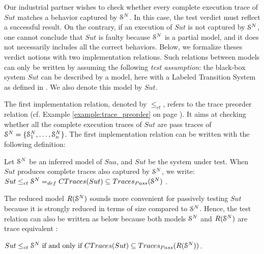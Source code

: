 Our industrial partner wishes to check whether every complete
execution trace of $\mathit{Sut}$ matches a behavior captured by
$\EuScript{S}^{N}$. In this case, the test verdict must reflect a
successful result. On the contrary, if an execution of
$\mathit{Sut}$ is not captured by $\EuScript{S}^{N}$, one cannot
conclude that $\mathit{Sut}$ is faulty because $\EuScript{S}^{N}$
is a partial model, and it does not necessarily includes all the
correct behaviors. Below, we formalize theses verdict notions
with two implementation relations. Such relations between models
can only be written by assuming the following \emph{test
assumption}: the black-box system $\mathit{Sut}$ can be described
by a model, here with a Labeled Transition System as defined in
. We also
denote this model by $\mathit{Sut}$.

The first implementation relation, denoted by $\leq_{ct}$, refers
to the trace preorder relation
\cite{DNH84,vaandrager1991relationship} (cf. Example
\ref{example:trace_preorder} on page
\pageref{example:trace_preorder}).
It aims at checking whether all the complete execution traces of
$\mathit{Sut}$ are pass traces of
$\EuScript{S}^{N}=\{\EuScript{S}_1^{N},\dots,\EuScript{S}_n^{N}\}$.
The first implementation relation can be written with the
following definition:

\begin{definition}
\label{rel:impl1}

Let $\EuScript{S}^{N}$ be an inferred model of $\mathit{Sua}$, and
$\mathit{Sut}$ be the system under test. When $\mathit{Sut}$
produces complete traces also captured by $\EuScript{S}^{N}$, we
write: ${Sut} \leq_{ct} \EuScript{S}^{N} =_{def} CTraces({Sut})
\subseteq  Traces_{Pass}(\EuScript{S}^{N})$ \cite{Tre96}.
\end{definition}

The reduced model $R(\EuScript{S}^{N})$ sounds more convenient
for passively testing $\mathit{Sut}$ because it is strongly
reduced in terms of size compared to $\EuScript{S}^{N}$.  Hence,
the test relation can also be written as below because both models
$\EuScript{S}^{N}$ and $R(\EuScript{S}^{N})$ are trace
equivalent \cite{petrenko06}:

\begin{proposition}
\label{rel:impl12}
${Sut} \leq_{ct} \EuScript{S}^{N} \text{ if and only if } CTraces({Sut})
\subseteq  Traces_{Pass}(R(\EuScript{S}^{N}))$.
\end{proposition}

